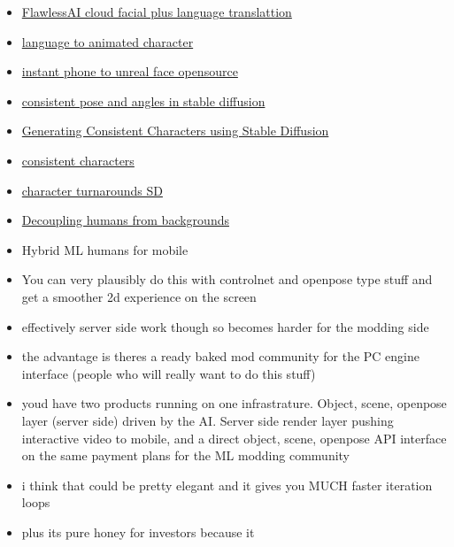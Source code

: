 \begin{itemize}
\begin{itemize}
  \item
    \href{https://www.flawlessai.com/}{FlawlessAI cloud facial plus
    language translattion}
  \item
    \href{https://masterpiecestudio.com/blog/announcing-generative-animations}{language
    to animated character}
  \item
    \href{https://github.com/JimWest/MeFaMo}{instant phone to unreal
    face opensource}
  \item
    \href{https://www.youtube.com/watch?v=zgj24gTjQtY}{consistent pose
    and angles in stable diffusion}
  \item
    \href{https://www.youtube.com/watch?v=XWJGmNW15A4}{Generating
    Consistent Characters using Stable Diffusion}
  \item
    \href{https://www.youtube.com/watch?v=Ig1S2guCfKM}{consistent
    characters}
  \item
    \href{https://www.youtube.com/watch?v=-iwPVUzAWzk}{character
    turnarounds SD}
  \item
    \href{https://github.com/vye16/slahmr}{Decoupling humans from
    backgrounds}
  \item
    Hybrid ML humans for mobile
  \item
    \hypertarget{message-content-1079000811318812742}{}
    You can very plausibly do this with controlnet and openpose type
    stuff and get a smoother 2d experience on the screen
  \item
    \hypertarget{message-content-1079000989610283130}{}
    effectively server side work though so becomes harder for the
    modding side
  \item
    \hypertarget{message-content-1079001213984591922}{}
    the advantage is there\textquotesingle s a ready baked mod community
    for the PC engine interface (people who will really want to do this
    stuff)
  \item
    \hypertarget{message-content-1079001578956132422}{}
    you\textquotesingle d have two products running on one
    infrastrature. Object, scene, openpose layer (server side) driven by
    the AI. Server side render layer pushing interactive video to
    mobile, and a direct object, scene, openpose API interface on the
    same payment plans for the ML modding community
  \item
    \hypertarget{message-content-1079001659209945199}{}
    i think that could be pretty elegant and it gives you MUCH faster
    iteration loops
  \item
    plus it\textquotesingle s pure honey for investors because it

\end{itemize}
\end{itemize}
